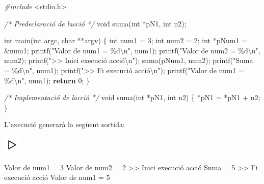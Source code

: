\documentclass[
]{book}
\newenvironment{Shaded}{\begin{snugshade}}{\end{snugshade}}
\newcommand{\CommentTok}[1]{\textcolor[rgb]{0.56,0.35,0.01}{\textit{#1}}}
\newcommand{\ControlFlowTok}[1]{\textcolor[rgb]{0.13,0.29,0.53}{\textbf{#1}}}
\newcommand{\DataTypeTok}[1]{\textcolor[rgb]{0.13,0.29,0.53}{#1}}
\newcommand{\DecValTok}[1]{\textcolor[rgb]{0.00,0.00,0.81}{#1}}
\newcommand{\ImportTok}[1]{#1}
\newcommand{\NormalTok}[1]{#1}
\newcommand{\PreprocessorTok}[1]{\textcolor[rgb]{0.56,0.35,0.01}{\textit{#1}}}
\newcommand{\SpecialCharTok}[1]{\textcolor[rgb]{0.00,0.00,0.00}{#1}}
\newcommand{\StringTok}[1]{\textcolor[rgb]{0.31,0.60,0.02}{#1}}
\begin{document}
\begin{Shaded}
\begin{Highlighting}[]
\PreprocessorTok{\#include }\ImportTok{\textless{}stdio.h\textgreater{}}

\CommentTok{/* Predeclaració de l\textquotesingle{}acció */}
\DataTypeTok{void}\NormalTok{ suma(}\DataTypeTok{int}\NormalTok{ *pN1, }\DataTypeTok{int}\NormalTok{ n2);}

\DataTypeTok{int}\NormalTok{ main(}\DataTypeTok{int}\NormalTok{ argc, }\DataTypeTok{char}\NormalTok{ **argv) \{}
    \DataTypeTok{int}\NormalTok{ num1 = }\DecValTok{3}\NormalTok{;}
    \DataTypeTok{int}\NormalTok{ num2 = }\DecValTok{2}\NormalTok{;}
    \DataTypeTok{int}\NormalTok{ *pNum1 = \&num1;}
\NormalTok{    printf(}\StringTok{"Valor de num1 = \%d}\SpecialCharTok{\textbackslash{}n}\StringTok{"}\NormalTok{, num1);}
\NormalTok{    printf(}\StringTok{"Valor de num2 = \%d}\SpecialCharTok{\textbackslash{}n}\StringTok{"}\NormalTok{, num2);}
\NormalTok{    printf(}\StringTok{"\textgreater{}\textgreater{} Inici execució acció}\SpecialCharTok{\textbackslash{}n}\StringTok{"}\NormalTok{); }
\NormalTok{    suma(pNum1, num2);}
\NormalTok{    printf(}\StringTok{"Suma = \%d}\SpecialCharTok{\textbackslash{}n}\StringTok{"}\NormalTok{, num1);}
\NormalTok{    printf(}\StringTok{"\textgreater{}\textgreater{} Fi execució acció}\SpecialCharTok{\textbackslash{}n}\StringTok{"}\NormalTok{);}
\NormalTok{    printf(}\StringTok{"Valor de num1 = \%d}\SpecialCharTok{\textbackslash{}n}\StringTok{"}\NormalTok{, num1);}
    \ControlFlowTok{return} \DecValTok{0}\NormalTok{;}
\NormalTok{\}}

\CommentTok{/* Implementació de l\textquotesingle{}acció */}
\DataTypeTok{void}\NormalTok{ suma(}\DataTypeTok{int}\NormalTok{ *pN1, }\DataTypeTok{int}\NormalTok{ n2) \{}
\NormalTok{    *pN1 = *pN1 + n2;}
\NormalTok{\}}
\end{Highlighting}
\end{Shaded}

L'execució generarà la següent sortida:

\includegraphics{./img/play.png}

\begin{Shaded}
\begin{Highlighting}[]
\NormalTok{Valor de num1 = }\DecValTok{3}
\NormalTok{Valor de num2 = }\DecValTok{2}
\NormalTok{\textgreater{}\textgreater{} Inici execució acció}
\NormalTok{Suma = }\DecValTok{5}
\NormalTok{\textgreater{}\textgreater{} Fi execució acció}
\NormalTok{Valor de num1 = }\DecValTok{5}
\end{Highlighting}
\end{Shaded}
\end{document}
